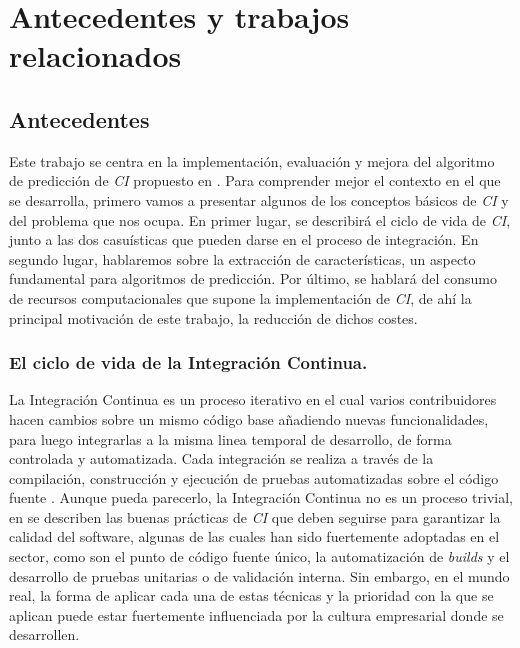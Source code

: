 \section{Antecedentes y trabajos relacionados}
\subsection{Antecedentes}
Este trabajo se centra en la implementación, evaluación y mejora del algoritmo de predicción de
\textit{CI} propuesto en \cite{2}. Para comprender mejor el contexto en el que se desarrolla,
primero vamos a presentar algunos de los conceptos básicos de \textit{CI} y del problema que
nos ocupa. En primer lugar, se describirá el ciclo de vida de \textit{CI}, junto a las dos
casuísticas que pueden darse en el proceso de integración. En segundo lugar, hablaremos sobre la
extracción de características, un aspecto fundamental para algoritmos de predicción. Por último,
se hablará del consumo de recursos computacionales que supone la implementación de \textit{CI},
de ahí la principal motivación de este trabajo, la reducción de dichos costes.


\subsubsection{El ciclo de vida de la Integración Continua.}
La Integración Continua es un proceso iterativo en el cual varios contribuidores hacen cambios
sobre un mismo código base añadiendo nuevas funcionalidades, para luego integrarlas a la misma
linea temporal de desarrollo, de forma controlada y automatizada. Cada integración se realiza
a través de la compilación, construcción y ejecución de pruebas automatizadas sobre el código
fuente \cite{10}. Aunque pueda parecerlo, la Integración Continua no es un proceso trivial, en
\cite{12} se describen las buenas prácticas de \textit{CI} que deben seguirse para garantizar
la calidad del software, algunas de las cuales han sido fuertemente adoptadas en el sector, como
son el punto de código fuente único, la automatización de \textit{builds} y el desarrollo de
pruebas unitarias o de validación interna. Sin embargo, en el mundo real, la forma de aplicar
cada una de estas técnicas y la prioridad con la que se aplican puede estar fuertemente
influenciada \cite{8} por la cultura empresarial donde se desarrollen.\\

